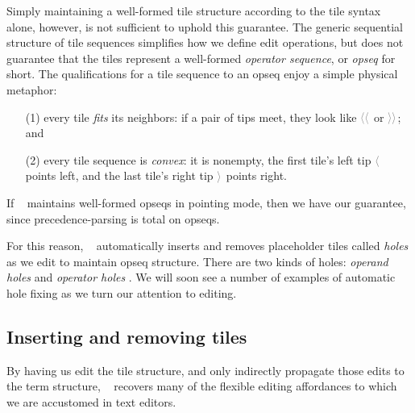 Simply maintaining a well-formed tile structure
according to the tile syntax alone, however, is
not sufficient to uphold this guarantee.
The generic sequential structure of tile sequences
simplifies how we define edit operations, but
does not guarantee that the tiles represent a well-formed
\emph{operator sequence}, or \emph{opseq} for short.
The qualifications for a tile sequence to an opseq
enjoy a simple physical metaphor:
\begin{enumerate}
\item[(1)] every tile \emph{fits} its neighbors:
  if a pair of tips meet, they look like $\ltiletip\ltiletip$
  or $\rtiletip\rtiletip$; and
\item[(2)] every tile sequence is \emph{convex}:
  it is nonempty, the first tile's left tip $\ltiletip$
  points left, and the last tile's right tip $\rtiletip$
  points right.
\end{enumerate}
If \tylr~ maintains well-formed opseqs in pointing mode, then we have
our guarantee, since precedence-parsing is total on opseqs.

For this reason, \tylr~ automatically inserts
and removes placeholder tiles called \emph{holes}
as we edit to maintain opseq structure.
There are two kinds of holes:
\emph{operand holes} \optile{\ophole}
and \emph{operator holes} \bintile{\binhole}.
We will soon see a number of examples of
automatic hole fixing as we turn our attention
to editing.




\subsection{Inserting and removing tiles} \label{sec:inserting-removing}
By having us edit the tile structure, and only
indirectly propagate those edits to the term structure,
\tylr~ recovers many of the flexible editing affordances to
which we are accustomed in text editors.

